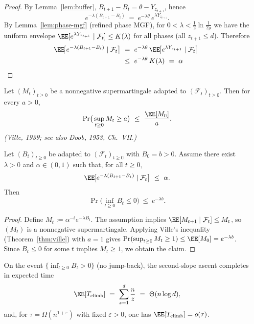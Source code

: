 \begin{proof}
	By Lemma~\ref{lem:buffer}, $B_{t+1}-B_t=\theta-Y_{z_{t+1}}$, hence
	\[
	e^{-\lambda(B_{t+1}-B_t)}\ =\ e^{-\lambda\theta}\,e^{\lambda Y_{z_{t+1}}}.
	\]
	By Lemma~\ref{lem:phase-mgf} (refined phase MGF), for $0<\lambda<\tfrac12\ln\!\tfrac{1}{2\rho}$ we have the uniform envelope
	$\EE[e^{\lambda Y_{z_{t+1}}}\mid\mathcal F_t]\le K(\lambda)$ for all phases (all $z_{t+1}\le d$). Therefore
	\begin{align*}
		\EE\!\big[e^{-\lambda(B_{t+1}-B_t)}\mid \mathcal F_t\big]
		\ &=\ e^{-\lambda\theta}\,\EE\!\big[e^{\lambda Y_{z_{t+1}}}\mid\mathcal F_t\big]
		\ \\ &\le\ e^{-\lambda\theta}\,K(\lambda)
		\ =\ \alpha	
	\end{align*}
\end{proof}
\begin{theorem}\label{thm:ville}
	Let $(M_t)_{t\ge 0}$ be a nonnegative supermartingale adapted to $(\mathcal F_t)_{t\ge 0}$. 
	Then for every $a>0$,
	\[
	\Pr\!\big(\sup_{t\ge 0} M_t \ge a\big)\ \le\ \frac{\EE[M_0]}{a}.
	\]
	\emph{(Ville, 1939; see also Doob, 1953, Ch.~VII.)}
\end{theorem}

\begin{corollary}\label{cor:ville-exponential}
	Let $(B_t)_{t\ge 0}$ be adapted to $(\mathcal F_t)_{t\ge 0}$ with $B_0=b>0$.
	Assume there exist $\lambda>0$ and $\alpha\in(0,1)$ such that, for all $t\ge 0$,
	\[
	\EE\!\big[e^{-\lambda(B_{t+1}-B_t)}\mid \mathcal F_t\big]\ \le\ \alpha.
	\]
	Then
	\[
	\Pr\!\big(\inf_{t\ge 0} B_t \le 0\big)\ \le\ e^{-\lambda b}.
	\]
\end{corollary}

\begin{proof}
	Define $M_t:=\alpha^{-t}e^{-\lambda B_t}$. The assumption implies
	$\EE[M_{t+1}\mid\mathcal F_t]\le M_t$, so $(M_t)$ is a nonnegative supermartingale.
	Applying Ville’s inequality (Theorem~\ref{thm:ville}) with $a=1$ gives
	$\Pr(\sup_{t\ge 0} M_t\ge 1)\le \EE[M_0]=e^{-\lambda b}$.
	Since $B_t\le 0$ for some $t$ implies $M_t\ge 1$, we obtain the claim.
	
\end{proof}


\begin{lemma}\label{prop:climb-time}
	On the event $\{\inf_{t\ge 0} B_t>0\}$ (no jump-back), the second-slope ascent completes in expected time
	\[
	\EE[T_{\mathrm{climb}}]\ =\ \sum_{z=1}^{d}\frac{n}{z}\ =\ \Theta(n\log d),
	\]
	and, for $\tau=\Omega(n^{1+\varepsilon})$ with fixed $\varepsilon>0$, one has $\EE[T_{\mathrm{climb}}]=o(\tau)$.
\end{lemma}

